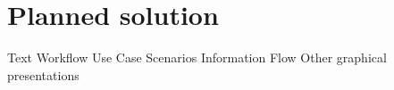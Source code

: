 \section{Planned solution}

Text
\newline
Workflow
\newline
Use Case Scenarios
\newline
Information Flow
\newline
Other graphical presentations